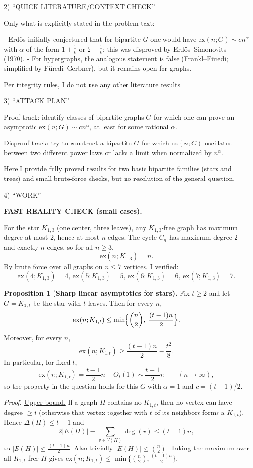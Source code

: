 2) “QUICK LITERATURE/CONTEXT CHECK”

Only what is explicitly stated in the problem text:

- Erd\H{o}s initially conjectured that for bipartite $G$ one would have $\mathrm{ex}(n;G)\sim c n^{\alpha}$ with $\alpha$ of the form $1+\frac1k$ or $2-\frac1k$; this was disproved by Erd\H{o}s--Simonovits (1970).
- For hypergraphs, the analogous statement is false (Frankl--F\"{u}redi; simplified by F\"{u}redi--Gerbner), but it remains open for graphs.

Per integrity rules, I do not use any other literature results.

3) “ATTACK PLAN”

Proof track: identify classes of bipartite graphs $G$ for which one can prove an asymptotic $\mathrm{ex}(n;G)\sim c n^{\alpha}$, at least for some rational $\alpha$.

Disproof track: try to construct a bipartite $G$ for which $\mathrm{ex}(n;G)$ oscillates between two different power laws or lacks a limit when normalized by $n^{\alpha}$.

Here I provide fully proved results for two basic bipartite families (stars and trees) and small brute-force checks, but no resolution of the general question.

4) “WORK”

\textbf{FAST REALITY CHECK (small cases).}

For the star $K_{1,3}$ (one center, three leaves), any $K_{1,3}$-free graph has maximum degree at most $2$, hence at most $n$ edges. The cycle $C_n$ has maximum degree $2$ and exactly $n$ edges, so for all $n\ge 3$,
\[
\mathrm{ex}(n;K_{1,3})=n.
\]
By brute force over all graphs on $n\le 7$ vertices, I verified:
\[
\mathrm{ex}(4;K_{1,3})=4,\ \mathrm{ex}(5;K_{1,3})=5,\ \mathrm{ex}(6;K_{1,3})=6,\ \mathrm{ex}(7;K_{1,3})=7.
\]

\medskip
\textbf{Proposition 1 (Sharp linear asymptotics for stars).}
Fix $t\ge 2$ and let $G=K_{1,t}$ be the star with $t$ leaves. Then for every $n$,
\[
\mathrm{ex}(n;K_{1,t})\le \min\Bigl\{\binom{n}{2},\ \frac{(t-1)n}{2}\Bigr\}.
\]
Moreover, for every $n$,
\[
\mathrm{ex}(n;K_{1,t})\ge \frac{(t-1)n}{2}-\frac{t^2}{8}.
\]
In particular, for fixed $t$,
\[
\mathrm{ex}(n;K_{1,t})=\frac{t-1}{2}n+O_t(1)\sim \frac{t-1}{2}n
\qquad (n\to\infty),
\]
so the property in the question holds for this $G$ with $\alpha=1$ and $c=(t-1)/2$.

\emph{Proof.}
\underline{Upper bound.}
If a graph $H$ contains no $K_{1,t}$, then no vertex can have degree $\ge t$ (otherwise that vertex together with $t$ of its neighbors forms a $K_{1,t}$). Hence $\Delta(H)\le t-1$ and
\[
2|E(H)|=\sum_{v\in V(H)} \deg(v) \le (t-1)n,
\]
so $|E(H)|\le \frac{(t-1)n}{2}$. Also trivially $|E(H)|\le \binom{n}{2}$. Taking the maximum over all $K_{1,t}$-free $H$ gives
\(\mathrm{ex}(n;K_{1,t})\le \min\{\binom{n}{2},\frac{(t-1)n}{2}\}.\)

